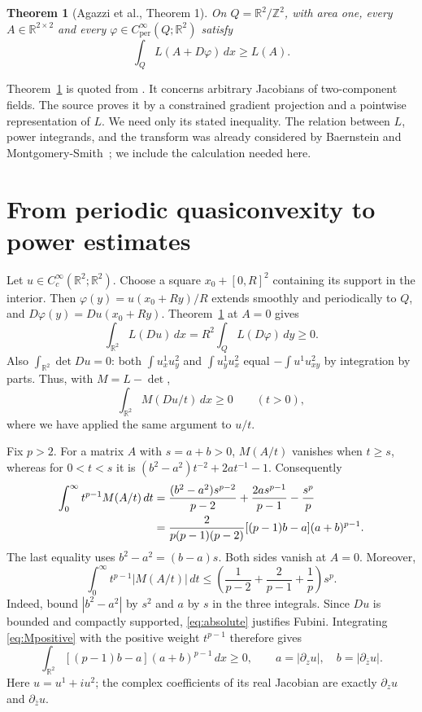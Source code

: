 \documentclass[11pt]{article}
\newtheorem{theorem}{Theorem}
\newcommand{\R}{\mathbb R}
\newcommand{\dz}{\partial_z}
\newcommand{\db}{\partial_{\bar z}}
\begin{document}
\begin{theorem}[Agazzi et al., Theorem 1]\label{thm:source}
On \(Q=\R^2/\mathbb Z^2\), with area one, every
\(A\in\R^{2\times2}\) and every
\(\varphi\in C^\infty_{\mathrm{per}}(Q;\R^2)\) satisfy
\begin{equation}\label{eq:qc}
 \int_Q L(A+D\varphi)\,dx\ge L(A).
\end{equation}
\end{theorem}

Theorem~\ref{thm:source} is quoted from \cite[Theorem~1 and
Section~2]{agazzi}. It concerns arbitrary Jacobians of two-component
fields. The source proves it by a constrained gradient projection and a
pointwise representation of \(L\). We need only its stated inequality.
The relation between \(L\), power integrands, and the transform was
already considered by Baernstein and Montgomery-Smith~\cite{bms};
we include the calculation needed here.

\section{From periodic quasiconvexity to power estimates}

Let \(u\in C_c^\infty(\R^2;\R^2)\). Choose a square
\(x_0+[0,R]^2\) containing its support in the interior. Then
\(\varphi(y)=u(x_0+Ry)/R\) extends smoothly and periodically to \(Q\),
and \(D\varphi(y)=Du(x_0+Ry)\). Theorem~\ref{thm:source} at \(A=0\)
gives
\[
 \int_{\R^2}L(Du)\,dx=R^2\int_Q L(D\varphi)\,dy\ge0.
\]
Also \(\int_{\R^2}\det Du=0\): both
\(\int u^1_xu^2_y\) and \(\int u^1_yu^2_x\) equal
\(-\int u^1u^2_{xy}\) by integration by parts. Thus, with \(M=L-\det\),
\begin{equation}\label{eq:Mpositive}
 \int_{\R^2}M(Du/t)\,dx\ge0\qquad(t>0),
\end{equation}
where we have applied the same argument to \(u/t\).

Fix \(p>2\). For a matrix \(A\) with \(s=a+b>0\), \(M(A/t)\)
vanishes when \(t\ge s\), whereas for \(0<t<s\) it is
\((b^2-a^2)t^{-2}+2at^{-1}-1\). Consequently
\begin{align}
 \int_0^\infty t^{p-1}M(A/t)\,dt
 &=\frac{(b^2-a^2)s^{p-2}}{p-2}
      +\frac{2as^{p-1}}{p-1}-\frac{s^p}{p}\notag\\
 &=\frac{2}{p(p-1)(p-2)}
                [(p-1)b-a](a+b)^{p-1}. \label{eq:mellin}
\end{align}
The last equality uses \(b^2-a^2=(b-a)s\).
Both sides vanish at \(A=0\). Moreover,
\begin{equation}\label{eq:absolute}
 \int_0^\infty t^{p-1}|M(A/t)|\,dt
 \le\left(\frac1{p-2}+\frac2{p-1}+\frac1p\right)s^p .
\end{equation}
Indeed, bound \(|b^2-a^2|\) by \(s^2\) and \(a\) by \(s\)
in the three integrals. Since \(Du\) is bounded and compactly supported,
\eqref{eq:absolute} justifies Fubini. Integrating
\eqref{eq:Mpositive} with the positive weight \(t^{p-1}\) therefore gives
\begin{equation}\label{eq:Burkholder}
 \int_{\R^2}[(p-1)b-a](a+b)^{p-1}\,dx\ge0,
 \qquad a=|\dz u|,\quad b=|\db u|.
\end{equation}
Here \(u=u^1+iu^2\); the complex coefficients of its real Jacobian
are exactly \(\dz u\) and \(\db u\).
\end{document}
